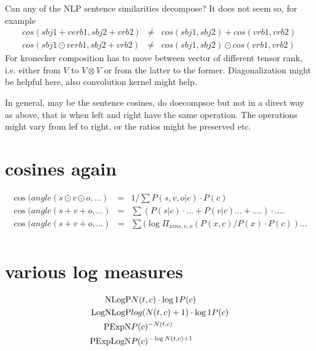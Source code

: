 Can any of the NLP sentence similarities decompose? It does not seem so, for example
\begin{eqnarray*}
cos(sbj1+verb1,sbj2+vrb2) &\neq& cos(sbj1, sbj2) + cos(vrb1,vrb2) \\
cos(sbj1\odot verb1,sbj2+vrb2) &\neq& cos(sbj1, sbj2) \odot cos(vrb1,vrb2)
\end{eqnarray*}
For kronecker composition has to move between vector of different tensor rank, i.e. either from $V$ to $V \otimes V$ or from the latter to the former. Diagonalization might be helpful here, also convolution kernel might help. 

In general, may be the sentence cosines, do doecompsoe but not in a direct way as above, that is when left and right have the same operation. The operations might vary from lef to right, or the ratios might be preserved etc. 



\section{cosines again}

\begin{eqnarray}
\cos(angle(s\odot v\odot o, ...) &=&  1/ \sum P(s,v,o|c) \cdot P(c)\\
\cos(angle(s+v+o, ...) &=& \sum (P(s|c)  \cdot  ... + P(v|c) ... + ....)  \cdot  ....\\
\cos(angle(s+v+o, ...) &=&  \sum (\log{\Pi_{x in s,v,o} (P(x,c)/P(x) \cdot P(c)) ...}\\
\end{eqnarray}

\section{various log measures}

\begin{eqnarray}
\textmd{NLogP}&   N(t,c)  \cdot \log{1}{P(c)}\\
\textmd{LogNLogP}&  log(N(t,c)+1) \cdot \log{1}{P(c)}\\
\textmd{PExpN}&    P(c)^{-N(t,c)}\\
\textmd{PExpLogN}& P(c)^{-\log{N(t,c)+1}}\\
\end{eqnarray}

